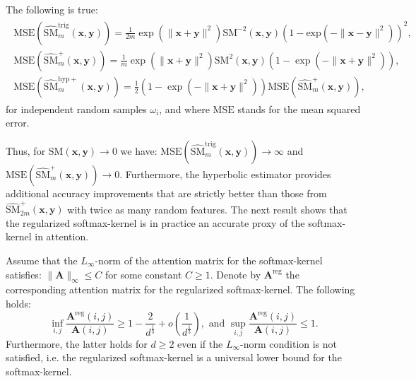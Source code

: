 \begin{lemma}
\label{mse-lemma}
The following is true:
\begin{align}
\begin{split}
\mathrm{MSE}(\widehat{\mathrm{SM}}^{\mathrm{trig}}_{m}(\mathbf{x}, \mathbf{y})) =
\frac{1}{2m} \exp(\|\mathbf{x}+\mathbf{y}\|^{2})\mathrm{SM}^{-2}(\mathbf{x},\mathbf{y})
(1-\mathrm{exp}(-\|\mathbf{x}-\mathbf{y}\|^{2}))^{2}, \\ 
\mathrm{MSE}(\widehat{\mathrm{SM}}^{\mathrm{+}}_{m}(\mathbf{x}, \mathbf{y})) = \frac{1}{m}\exp(\|\mathbf{x}+\mathbf{y}\|^{2})\mathrm{SM}^{2}(\mathbf{x},\mathbf{y})(1-\exp(-\|\mathbf{x}+\mathbf{y}\|^{2})),\\
\mathrm{MSE}(\widehat{\mathrm{SM}}^{\mathrm{hyp}+}_{m}(\mathbf{x}, \mathbf{y})) =
\frac{1}{2}(1-\exp(-\|\mathbf{x}+\mathbf{y}\|^{2}))\mathrm{MSE}(\widehat{\mathrm{SM}}^{\mathrm{+}}_{m}(\mathbf{x}, \mathbf{y})),
\end{split}
\end{align}
for independent random samples $\omega_{i}$, and where $\mathrm{MSE}$ stands for the mean squared error.
\end{lemma}

Thus, for $\mathrm{SM}(\mathbf{x}, \mathbf{y}) \rightarrow 0$ we have: $\mathrm{MSE}(\widehat{\mathrm{SM}}^{\mathrm{trig}}_{m}(\mathbf{x}, \mathbf{y})) \rightarrow \infty$ and $\mathrm{MSE}(\widehat{\mathrm{SM}}^{\mathrm{+}}_{m}(\mathbf{x}, \mathbf{y})) \rightarrow 0$. Furthermore, the hyperbolic estimator provides additional accuracy improvements that are strictly better than those from $\widehat{\mathrm{SM}}_{2m}^{\mathrm{+}}(\mathbf{x}, \mathbf{y})$ with twice as many random features. The next result shows that the regularized softmax-kernel is in practice an accurate proxy of the softmax-kernel in attention.

\begin{theorem}
\label{reg-theorem}
Assume that the $L_{\infty}$-norm of the attention matrix for the softmax-kernel satisfies: $\|\mathbf{A}\|_{\infty} \leq C$ for some constant $C \geq 1$. Denote by $\mathbf{A}^{\mathrm{reg}}$ the corresponding attention matrix for the regularized softmax-kernel. The following holds:
\begin{equation}
\inf_{i,j} \frac{\mathbf{A}^{\mathrm{reg}}(i,j)}{\mathbf{A}(i, j)} \geq 1 - \frac{2}{d^{\frac{1}{3}}} + o\left(\frac{1}{d^{\frac{1}{3}}}\right), \textrm{ and } \sup_{i,j} \frac{\mathbf{A}^{\mathrm{reg}}(i,j)}{\mathbf{A}(i, j)} \leq 1. 
\end{equation}
Furthermore, the latter holds for $d \geq 2$ even if the $L_{\infty}$-norm condition is not satisfied, i.e. the regularized softmax-kernel is a universal lower bound for the softmax-kernel. 
\end{theorem}

